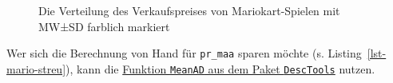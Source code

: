 \documentclass[
  letterpaper,
  oneside,
  open=any]{scrbook}
\theoremstyle{definition}
\theoremstyle{definition}
\theoremstyle{definition}
\theoremstyle{remark}
\begin{document}
\begin{figure}

\begin{minipage}{0.50\linewidth}



\end{minipage}%
%
\begin{minipage}{0.50\linewidth}



\end{minipage}%

\caption{\label{fig-var}Die Verteilung des Verkaufspreises von
Mariokart-Spielen mit MW±SD farblich markiert}

\end{figure}%

Wer sich die Berechnung von Hand für \texttt{pr\_maa} sparen möchte (s.
Listing~\ref{lst-mario-streu}), kann die
\href{https://rdrr.io/cran/DescTools/man/MeanAD.html}{Funktion
\texttt{MeanAD} aus dem Paket \texttt{DescTools}} nutzen.
\end{document}
